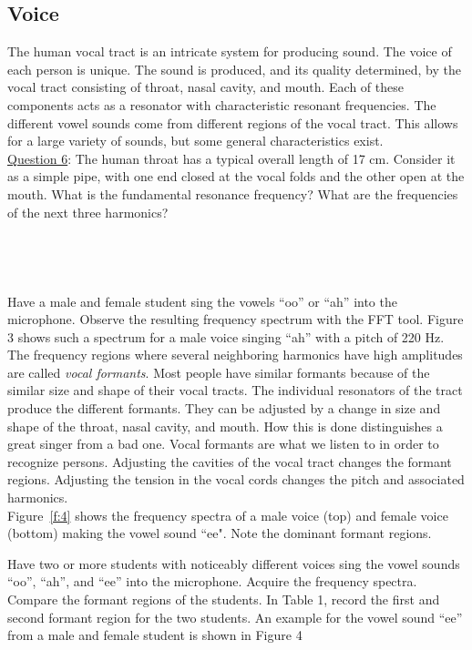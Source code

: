 \documentclass[11pt]{NSF}
\begin{document}
\subsection{Voice}

The human vocal tract is an intricate system for producing sound. The
voice of each person is unique. The sound is produced, and its quality
determined, by the vocal tract consisting of throat, nasal cavity, and
mouth. Each of these components acts as a resonator with
characteristic resonant frequencies. The different vowel sounds come
from different regions of the vocal tract. This allows for a large
variety of sounds, but some general characteristics exist. \\

\underline{Question 6}: 
The human throat has a typical overall length of 17 cm. Consider
it as a simple pipe, with one end closed at the vocal folds and the
other open at the mouth. What is the fundamental resonance frequency?
What are the frequencies of the next three harmonics?
\\
\\
\\
\\
\\

Have a male and female student sing the vowels “oo” or “ah” into the microphone. Observe the
resulting frequency spectrum with the FFT tool. Figure 3 shows such a spectrum for a male voice
singing “ah” with a pitch of 220 Hz. \\

The frequency regions where several neighboring harmonics have high
amplitudes are called {\em vocal formants}. Most people have similar
formants because of the similar size and shape of their vocal tracts. 
The individual resonators of the tract produce the different formants.
They can be adjusted by a change in size and shape of the throat,
nasal cavity, and mouth. How this is done distinguishes a great singer
from a bad one. Vocal formants are what we listen to in order to
recognize persons. Adjusting the cavities of the vocal tract changes
the formant regions. Adjusting the tension in the vocal cords changes
the pitch and associated harmonics. \\

Figure~\ref{f:4} shows the frequency spectra of a male voice (top) 
and female voice (bottom) making the vowel sound ``ee".
Note the dominant formant regions.

Have two or more students with noticeably different voices sing the vowel sounds “oo”,
“ah”, and “ee” into the microphone. Acquire the frequency spectra. Compare the formant
regions of the students. In Table 1, record the first and second formant region for the two
students. An example for the vowel sound “ee” from a male and female student is shown in
Figure 4
\end{document}
